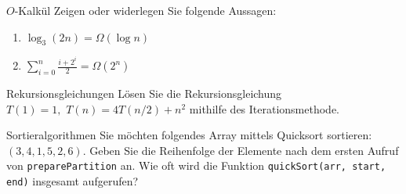 \documentclass[11pt,a4paper]{article}
\begin{document}
\begin{aufgabe}{2}{$O$-Kalkül}
    Zeigen oder widerlegen Sie folgende Aussagen:
    \begin{enumerate}
        \item $\log_3(2n) = \Omega(\log n)$
        \item $\sum\limits_{i=0}^n \frac{i + 2^i}{2} = \Omega(2^n)$
    \end{enumerate}
\end{aufgabe}
\begin{aufgabe}{3}{Rekursionsgleichungen}
        Lösen Sie die Rekursionsgleichung $T(1) = 1, \,\, T(n) = 4T(n / 2) + n^2$ mithilfe des Iterationsmethode.
\end{aufgabe}
\begin{aufgabe}{4}{Sortieralgorithmen}
        Sie möchten folgendes Array mittels Quicksort sortieren: $(3, 4, 1, 5, 2, 6)$.
        Geben Sie die Reihenfolge der Elemente nach dem ersten Aufruf von \texttt{preparePartition} an.
        Wie oft wird die Funktion \texttt{quickSort(arr, start, end)} insgesamt aufgerufen?
\end{aufgabe}
\end{document}
